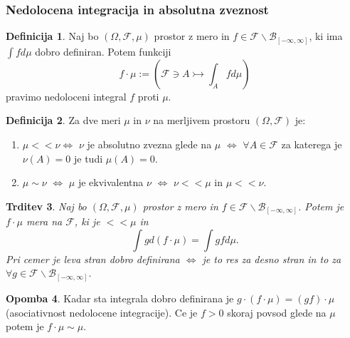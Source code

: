 \documentclass[a4paper,12pt]{article}
\theoremstyle{definition} %
\newtheorem{definicija}{Definicija}[section]
\newtheorem{opomba}[definicija]{Opomba}
\theoremstyle{plain} %
\newtheorem{trditev}[definicija]{Trditev}
\newcommand{\F}{\mathcal{F}}
\begin{document}
        \subsubsection{Nedolocena integracija in absolutna zveznost}
            \begin{definicija}
                Naj bo $(\Omega, \F, \mu)$ prostor z mero in $f \in \F\backslash\mathcal{B}_{[-\infty, \infty]}$, 
                ki ima $\int fd\mu$ dobro definiran. Potem funkciji 
                $$
                    f \cdot \mu:= (\F \ni A \rightarrowtail \int_A f d\mu)
                $$
                pravimo nedoloceni integral $f$ proti $\mu$.
            \end{definicija}

            \begin{definicija}
                Za dve meri $\mu$ in $\nu$ na merljivem prostoru $(\Omega, \F)$ je:
                \begin{enumerate}
                    \item $\mu << \nu \iff$ $\nu$ je absolutno zvezna glede na $\mu$ $\iff$ $\forall A \in \F$ za katerega je $\nu(A) = 0$ je tudi $\mu(A) = 0$. 
                    \item $\mu \sim \nu$ $\iff$ $\mu$ je ekvivalentna $\nu$ $\iff$ $\nu << \mu$ in $\mu << \nu.$
                \end{enumerate}
            \end{definicija}

            \begin{trditev}
                Naj bo $(\Omega, \F, \mu)$ prostor z mero in $f \in \F\backslash\mathcal{B}_{[-\infty, \infty]}$. Potem je 
                $f \cdot \mu$ mera na $\F$, ki je $<< \mu$ in 
                $$
                    \int g d(f \cdot \mu) = \int gf d\mu.
                $$
                Pri cemer je leva stran dobro definirana $\iff$ je to res za desno stran in to za $\forall g \in \F\backslash\mathcal{B}_{[-\infty, \infty]}$.
            \end{trditev}
            
            \begin{opomba}
                Kadar sta integrala dobro definirana je $g \cdot (f \cdot \mu) = (gf)\cdot \mu$ (asociativnost nedolocene integracije).
                Ce je $f>0$ skoraj povsod glede na $\mu$ potem je $f\cdot\mu \sim \mu$.
            \end{opomba}
\end{document}
